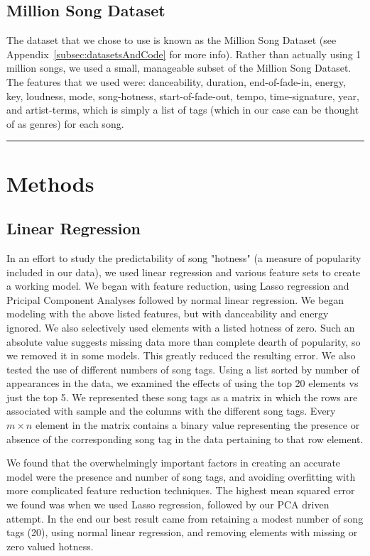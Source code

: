 \documentclass[12pt]{article}
\newcommand{\horizontalLine}{
	\begin{center}
		\hrule width 1.0\textwidth
	\end{center}
}
\begin{document}
\subsection{Million Song Dataset}
\label{subsec:datasetIntro}
The dataset that we chose to use is known as the Million Song Dataset (see Appendix~\ref{subsec:datasetsAndCode} for more info). Rather than actually using 1 million songs, we used a small, manageable subset of the Million Song Dataset. The features that we used were: danceability, duration, end-of-fade-in, energy, key, loudness, mode, song-hotness, start-of-fade-out, tempo, time-signature, year, and artist-terms, which is simply a list of tags (which in our case can be thought of as genres) for each song.

\horizontalLine
\section{Methods}
\label{sec:methods}

\subsection{Linear Regression}
\label{subsec:linearRegression}
In an effort to study the predictability of song "hotness" (a measure of popularity included in our data), we used linear regression and various feature sets to create a working model. We began with feature reduction, using Lasso regression and Pricipal Component Analyses followed by normal linear regression. We began modeling with the above listed features, but with danceability and energy ignored. We also selectively used elements with a listed hotness of zero. Such an absolute value suggests missing data more than complete dearth of popularity, so we removed it in some models. This greatly reduced the resulting error. We also tested the use of different numbers of song tags. Using a list sorted by number of appearances in the data, we examined the effects of using the top 20 elements vs just the top 5. We represented these song tags as a matrix in which the rows are associated with sample and the columns with the different song tags. Every $m \times n$ element in the matrix contains a binary value representing the presence or absence of the corresponding song tag in the data pertaining to that row element.

We found that the overwhelmingly important factors in creating an accurate model were the presence and number of song tags, and avoiding overfitting with more complicated feature reduction techniques. The highest mean squared error we found was when we used Lasso regression, followed by our PCA driven attempt. In the end our best result came from retaining a modest number of song tags (20), using normal linear regression, and removing elements with missing or zero valued hotness.
\end{document}
